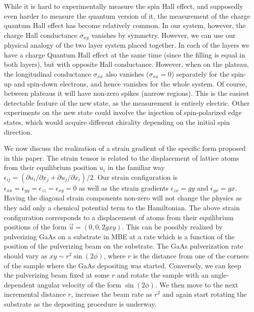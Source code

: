 \documentclass[prl,aps,amssymb,shownopacs,twocolumn]{revtex4}
\begin{document}
While it is hard to experimentally measure the spin Hall effect, and
supposedly even harder to measure the quantum version of it, the
measurement of the charge quantum Hall effect has become relatively
common. In our system, however, the charge Hall conductance
$\sigma_{xy}$ vanishes by symmetry. However, we can use our physical
analogy of the two layer system placed together. In each of the
layers we have a charge Quantum Hall effect at the same time (since
the filling is equal in both layers), but with opposite Hall
conductance. However, when on the plateau, the longitudinal
conductance $\sigma_{xx}$ also vanishes ($\sigma_{xx} =0$)
separately for the spin-up and spin-down electrons, and hence
vanishes for the whole system. Of course, between plateaus it will
have non-zero spikes (narrow regions). This is the easiest
detectable feature of the new state, as the measurement is entirely
electric. Other experiments on the new state could involve the
injection of spin-polarized edge states, which would acquire
different chirality depending on the initial spin direction.

We now discuss the realization of a strain gradient of the
specific form proposed in this paper. The strain tensor is related
to the displacement of lattice atoms from their equilibrium
position $u_i$ in the familiar way $\epsilon_{ij} = (\partial u_i
/\partial x_j +
\partial u_j /\partial x_i)/2$. Our strain configuration is
$\epsilon_{xx} =\epsilon_{yy} = \epsilon_{zz} = \epsilon_{xy}=0$ as
well as the strain gradients $\epsilon_{zx} = g y$ and
$\epsilon_{yx} = g x$. Having the diagonal strain components
non-zero will not change the physics as they add only a chemical
potential term to the Hamiltonian. The above strain configuration
corresponds to a displacement of atoms from their equilibrium
positions of the form $\vec{u} = (0,0, 2 g x y)$. This can be
possibly realized by pulverizing GaAs on a substrate in MBE at a
rate which is a function of the position of the pulverizing beam on
the substrate. The GaAs pulverization rate should vary as $xy \sim
r^2 \sin(2\phi)$, where $r$ is the distance from one of the corners
of the sample where the GaAs depositing was started. Conversely, we
can keep the pulverizing beam fixed at some $r$ and rotate the
sample with an angle-dependent angular velocity of the form $\sin(2
\phi)$. We then move to the next incremental distance $r$, increase
the beam rate as $r^2$ and again start rotating the substrate as the
depositing procedure is underway.
\end{document}
